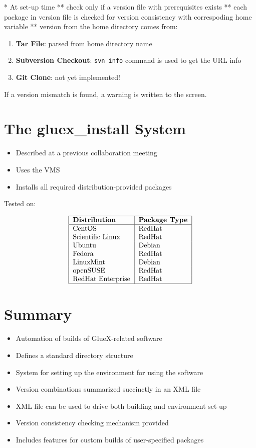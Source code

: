 \documentclass[12pt]{article}
\begin{document}
* At set-up time
** check only if a version file with prerequisites exists
** each package in version file is checked for version consistency with correspoding home variable
** version from the home directory comes from:
\begin{enumerate}
\item {\bf Tar File}: parsed from home directory name
\item {\bf Subversion Checkout}: {\tt svn info} command is used to get the URL info
\item {\bf Git Clone}: not yet implemented!
\end{enumerate}
If a version mismatch is found, a warning is written to the screen.

\section{The gluex\_install System}

\begin{itemize}
\item Described at a previous collaboration meeting
\item Uses the VMS
\item Installs all required distribution-provided packages
\end{itemize}

Tested on:

\begin{table}
$$
\begin{tabular}{|l|l|}
\hline
\bf Distribution & \bf Package Type \\
\hline
CentOS & RedHat \\
Scientific Linux & RedHat \\
Ubuntu & Debian \\
Fedora & RedHat \\
LinuxMint & Debian \\
openSUSE & RedHat \\
RedHat Enterprise & RedHat \\
\hline
\end{tabular}
$$
\end{table}

\section{Summary}

\begin{itemize}
\item Automation of builds of GlueX-related software
\item Defines a standard directory structure
\item System for setting up the environment for using the software
\item Version combinations summarized succinctly in an XML file
\item XML file can be used to drive both building and environment set-up
\item Version consistency checking mechanism provided
\item Includes features for custom builds of user-specified packages
\end{itemize}
\end{document}
